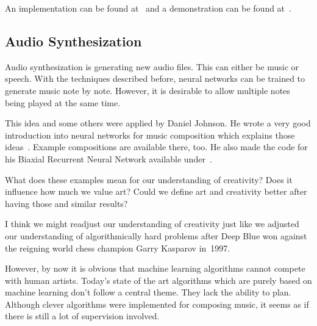\documentclass[technote,a4paper,leqno]{IEEEtran}
\begin{document}
An implementation can be found at~\cite{gruvGitHub} and a demonstration can
be found at~\cite{Vitelli2015}.

\subsection{Audio Synthesization}
Audio synthesization is generating new audio files. This can either be music or
speech. With the techniques described before, neural networks can be trained to
generate music note by note. However, it is desirable to allow multiple notes
being played at the same time.

This idea and some others were applied by Daniel Johnson. He wrote a very good
introduction into neural networks for music composition which explains those
ideas~\cite{Johnson2015}. Example compositions are available there, too. He
also made the code for his Biaxial Recurrent Neural Network available
under~\cite{Johnson2015a}.


What does these examples mean for our understanding of creativity? Does it
influence how much we value art? Could we define art and creativity better
after having those and similar results?

I think we might readjust our understanding of creativity just like we adjusted
our understanding of algorithmically hard problems after Deep Blue won against
the reigning world chess champion Garry Kasparov in~1997.

However, by now it is obvious that machine learning algorithms cannot compete
with human artists. Today's state of the art algorithms which are purely based
on machine learning don't follow a central theme. They lack the ability to
plan. Although clever algorithms were implemented for composing music, it seems
as if there is still a lot of supervision involved.
\end{document}
